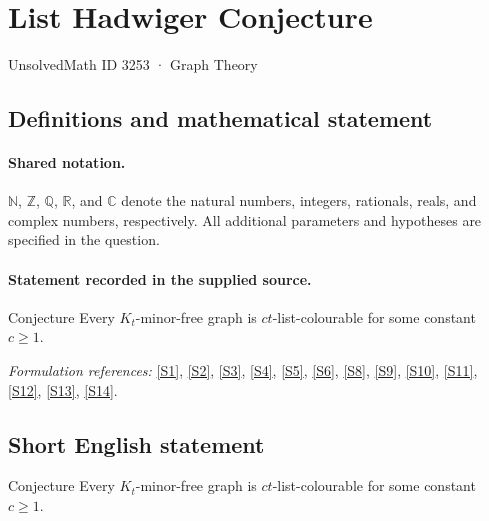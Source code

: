 \documentclass[11pt]{article}
\newcommand{\sref}[2]{\hyperlink{source:#1:#2}{[S#2]}}
\begin{document}
\setcounter{section}{3252}
\section{List Hadwiger Conjecture}\label{3253}
{\small UnsolvedMath ID 3253 · Graph Theory}
\subsection{Definitions and mathematical statement}

\paragraph{Shared notation.}$\mathbb N$, $\mathbb Z$, $\mathbb Q$, $\mathbb R$, and $\mathbb C$ denote the natural numbers, integers, rationals, reals, and complex numbers, respectively. All additional parameters and hypotheses are specified in the question.


\paragraph{Statement recorded in the supplied source.}
Conjecture Every $K_t$-minor-free graph is $c t$-list-colourable for some constant $c\geq1$.
\par\smallskip\textit{Formulation references:} \sref{3253}{1}, \sref{3253}{2}, \sref{3253}{3}, \sref{3253}{4}, \sref{3253}{5}, \sref{3253}{6}, \sref{3253}{8}, \sref{3253}{9}, \sref{3253}{10}, \sref{3253}{11}, \sref{3253}{12}, \sref{3253}{13}, \sref{3253}{14}.
\subsection{Short English statement}
Conjecture Every $K_t$-minor-free graph is $c t$-list-colourable for some constant $c\geq1$.
\end{document}
